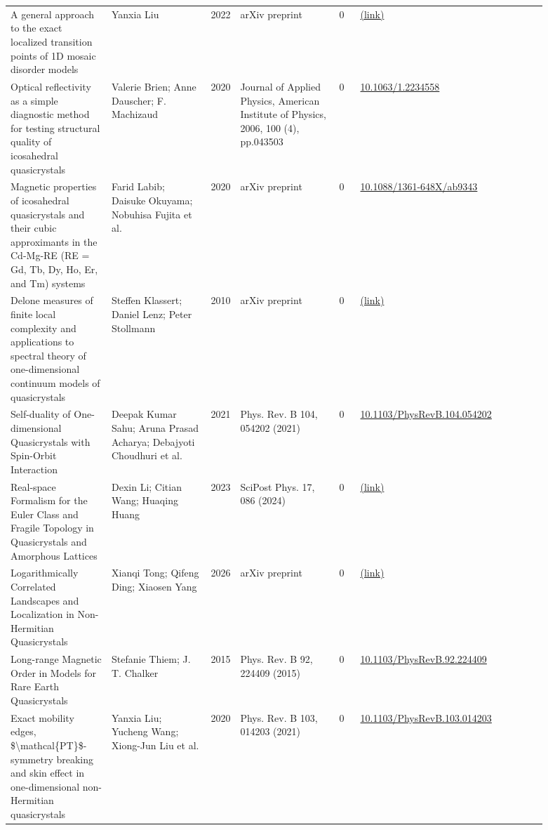\documentclass[10pt,a4paper]{article}
\begin{document}
{\begin{longtable}{p{0.192\linewidth}p{0.192\linewidth}p{0.043\linewidth}p{0.192\linewidth}p{0.043\linewidth}p{0.132\linewidth}p{0.096\linewidth}}
A general approach to the exact localized transition points of 1D mosaic disorder models & Yanxia Liu & 2022 & arXiv preprint & 0 & \href{http://arxiv.org/abs/2208.02762v2}{(link)} &  \\
Optical reflectivity as a simple diagnostic method for testing structural quality of icosahedral quasicrystals & Valerie Brien; Anne Dauscher; F. Machizaud & 2020 & Journal of Applied Physics, American Institute of Physics, 2006, 100 (4), pp.043503 & 0 & \href{https://doi.org/10.1063/1.2234558}{10.1063/1.2234558} &  \\
Magnetic properties of icosahedral quasicrystals and their cubic approximants in the Cd-Mg-RE (RE = Gd, Tb, Dy, Ho, Er, and Tm) systems & Farid Labib; Daisuke Okuyama; Nobuhisa Fujita et al. & 2020 & arXiv preprint & 0 & \href{https://doi.org/10.1088/1361-648X/ab9343}{10.1088/1361-648X/ab9343} &  \\
Delone measures of finite local complexity and applications to spectral theory of one-dimensional continuum models of quasicrystals & Steffen Klassert; Daniel Lenz; Peter Stollmann & 2010 & arXiv preprint & 0 & \href{http://arxiv.org/abs/1003.3574v1}{(link)} &  \\
Self-duality of One-dimensional Quasicrystals with Spin-Orbit Interaction & Deepak Kumar Sahu; Aruna Prasad Acharya; Debajyoti Choudhuri et al. & 2021 & Phys. Rev. B 104, 054202 (2021) & 0 & \href{https://doi.org/10.1103/PhysRevB.104.054202}{10.1103/PhysRevB.104.054202} &  \\
Real-space Formalism for the Euler Class and Fragile Topology in Quasicrystals and Amorphous Lattices & Dexin Li; Citian Wang; Huaqing Huang & 2023 & SciPost Phys. 17, 086 (2024) & 0 & \href{http://arxiv.org/abs/2311.01557v1}{(link)} &  \\
Logarithmically Correlated Landscapes and Localization in Non-Hermitian Quasicrystals & Xianqi Tong; Qifeng Ding; Xiaosen Yang & 2026 & arXiv preprint & 0 & \href{http://arxiv.org/abs/2608.11700v1}{(link)} &  \\
Long-range Magnetic Order in Models for Rare Earth Quasicrystals & Stefanie Thiem; J. T. Chalker & 2015 & Phys. Rev. B 92, 224409 (2015) & 0 & \href{https://doi.org/10.1103/PhysRevB.92.224409}{10.1103/PhysRevB.92.224409} &  \\
Exact mobility edges, \$\textbackslash{}mathcal\{PT\}\$-symmetry breaking and skin effect in one-dimensional non-Hermitian quasicrystals & Yanxia Liu; Yucheng Wang; Xiong-Jun Liu et al. & 2020 & Phys. Rev. B 103, 014203 (2021) & 0 & \href{https://doi.org/10.1103/PhysRevB.103.014203}{10.1103/PhysRevB.103.014203} &  \\

\end{longtable}}
\end{document}
